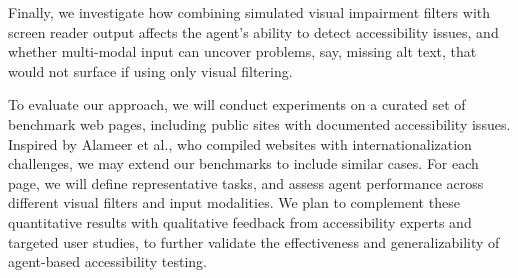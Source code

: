 Finally, we investigate how combining simulated visual impairment filters with screen reader output affects the agent's ability to detect accessibility issues, and whether multi-modal input can uncover problems, say, missing alt text, that would not surface if using only visual filtering.

To evaluate our approach, we will conduct experiments on a curated set of benchmark web pages, including public sites with documented accessibility issues. Inspired by Alameer et al.\cite{alameer2016detecting}, who compiled websites with internationalization challenges, we may extend our benchmarks to include similar cases. For each page, we will define representative tasks, and assess agent performance across different visual filters and input modalities. We plan to complement these quantitative results with qualitative feedback from accessibility experts and targeted user studies, to further validate the effectiveness and generalizability of agent-based accessibility testing.

\vspace{-4pt}